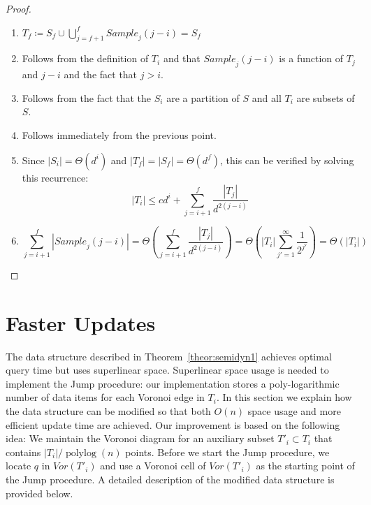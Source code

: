 \documentclass[10pt,a4paper]{amsart}
\newcommand{\Sample}{\mathit{Sample}}
\newcommand{\Voron}{\mathit{Vor}}
\newcommand{\john}[1]{\textcolor{red}{#1}}
\begin{document}
\begin{proof} \ \\
	\begin{enumerate}
 \setlength{\itemsep}{1pt}
\setlength{\parskip}{0pt}
\setlength{\parsep}{0pt} 
		\item $ T_f \coloneqq S_f \cup \bigcup_{j=f+1}^{f} \Sample_j(j-i) = S_f$
		\item Follows from the definition of $T_i$ and that $\Sample_j(j-i)$ is a function of $T_j$ and $j-i$ and the fact that $j>i$. 
		\item Follows from the fact that the $S_i$ are a partition of $S$ and all $T_i$ are subsets of $S$.
		\item Follows immediately from the previous point.
		\item 
  Since $|S_i|=\Theta(d^i)$ and $|T_f|=|S_f|=\Theta(d^f)$,
  this can be verified by solving this recurrence: %
		$$ |T_i| \leq cd^i + \sum_{j=i+1}^f \frac{|T_j|}{d^{2(j-i)}}
		$$
		\item $$
		\sum_{j=i+1}^f |\Sample_j(j-i)|
	=
\Theta\left(		\sum_{j=i+1}^f\frac{|T_j|}{d^{2(j-i)}}	\right)
=
\Theta\left(	 |T_i|	\sum_{j'=1}^{\infty}\frac{1}{2^{j'}}	\right) =\Theta(|T_i|)
$$
	\end{enumerate}
\end{proof}



\section{Faster Updates}
\label{sec:ins-faster}
The data structure described in Theorem~\ref{theor:semidyn1} achieves optimal query time but  uses superlinear space. Superlinear space usage is needed to implement the Jump procedure: our implementation stores a poly-logarithmic number of  data items for each Voronoi edge in $T_i$. In this section we explain how the data structure can be modified so that both $O(n)$ space usage and more efficient update time are achieved.
Our improvement is based on the following idea: We maintain the Voronoi diagram for an auxiliary subset $T'_i\subset T_i$ that contains $|T_i|/\operatorname{polylog}(n)$ points.  Before we start the Jump procedure, we locate $q$ in $\Voron(T'_i)$ and use a Voronoi cell of $\Voron(T'_i)$ as the starting point of the Jump procedure.
A  detailed description of the modified data structure is provided below. 
\end{document}
